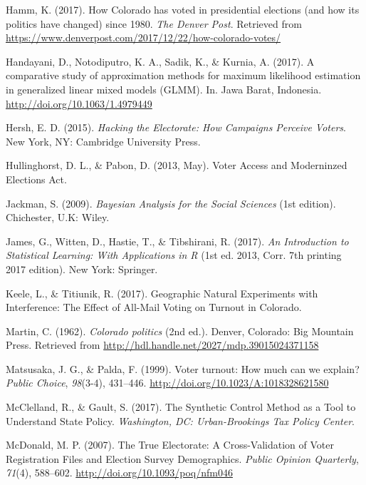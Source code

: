 \documentclass[12pt,twoside]{reedthesis}
\begin{document}
  \hypertarget{ref-hamm_how_2017}{}
  Hamm, K. (2017). How Colorado has voted in presidential elections (and
  how its politics have changed) since 1980. \emph{The Denver Post}.
  Retrieved from
  \url{https://www.denverpost.com/2017/12/22/how-colorado-votes/}
  
  \hypertarget{ref-handayani_comparative_2017}{}
  Handayani, D., Notodiputro, K. A., Sadik, K., \& Kurnia, A. (2017). A
  comparative study of approximation methods for maximum likelihood
  estimation in generalized linear mixed models (GLMM). In. Jawa Barat,
  Indonesia. \url{http://doi.org/10.1063/1.4979449}
  
  \hypertarget{ref-hersh_hacking_2015}{}
  Hersh, E. D. (2015). \emph{Hacking the Electorate: How Campaigns
  Perceive Voters}. New York, NY: Cambridge University Press.
  
  \hypertarget{ref-hullinghorst_voter_2013}{}
  Hullinghorst, D. L., \& Pabon, D. (2013, May). Voter Access and
  Moderninzed Elections Act.
  
  \hypertarget{ref-jackman_bayesian_2009}{}
  Jackman, S. (2009). \emph{Bayesian Analysis for the Social Sciences}
  (1st edition). Chichester, U.K: Wiley.
  
  \hypertarget{ref-james_introduction_2017}{}
  James, G., Witten, D., Hastie, T., \& Tibshirani, R. (2017). \emph{An
  Introduction to Statistical Learning: With Applications in R} (1st ed.
  2013, Corr. 7th printing 2017 edition). New York: Springer.
  
  \hypertarget{ref-keele_geographic_2017}{}
  Keele, L., \& Titiunik, R. (2017). Geographic Natural Experiments with
  Interference: The Effect of All-Mail Voting on Turnout in Colorado.
  
  \hypertarget{ref-martin_colorado_1962}{}
  Martin, C. (1962). \emph{Colorado politics} (2nd ed.). Denver, Colorado:
  Big Mountain Press. Retrieved from
  \url{http://hdl.handle.net/2027/mdp.39015024371158}
  
  \hypertarget{ref-matsusaka_voter_1999}{}
  Matsusaka, J. G., \& Palda, F. (1999). Voter turnout: How much can we
  explain? \emph{Public Choice}, \emph{98}(3-4), 431--446.
  \url{http://doi.org/10.1023/A:1018328621580}
  
  \hypertarget{ref-mcclelland_synthetic_2017}{}
  McClelland, R., \& Gault, S. (2017). The Synthetic Control Method as a
  Tool to Understand State Policy. \emph{Washington, DC: Urban-Brookings
  Tax Policy Center}.
  
  \hypertarget{ref-mcdonald_true_2007}{}
  McDonald, M. P. (2007). The True Electorate: A Cross-Validation of Voter
  Registration Files and Election Survey Demographics. \emph{Public
  Opinion Quarterly}, \emph{71}(4), 588--602.
  \url{http://doi.org/10.1093/poq/nfm046}
  
\end{document}
